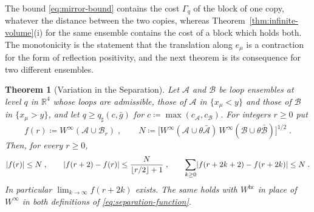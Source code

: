 \documentclass[11pt]{preprint}
\DeclarePairedDelimiter{\abs}{\lvert}{\rvert}
\numberwithin{equation}{section}
\newtheorem{theorem}{Theorem}[section]
\theoremstyle{definition}
\theoremstyle{remark}
\theoremstyle{plain}
\begin{document}
The bound \eqref{eq:mirror-bound} contains the cost $\Gamma_q$ of the block of one copy, whatever the distance between the two copies, whereas Theorem~\ref{thm:infinite-volume}(i) for the same ensemble contains the cost of a block which holds both. The monotonicity is the statement that the translation along $e_\mu$ is a contraction for the form of reflection positivity, and the next theorem is its consequence for two different ensembles.

\begin{theorem}[Variation in the Separation]\label{thm:separation}
Let $\mathcal A$ and $\mathcal B$ be loop ensembles at level $q$ in $\mathbb R^4$ whose loops are admissible, those of $\mathcal A$ in $\{ x_\mu < y \}$ and those of $\mathcal B$ in $\{ x_\mu > y \}$, and let $q \geq q_\sharp(c, \bar g)$ for $c \coloneqq \max(c_{\mathcal A}, c_{\mathcal B})$. For integers $r \geq 0$ put
\begin{equation}\label{eq:separation-function}
    f(r) \coloneqq W^\infty(\mathcal A \cup \mathcal B_r)\;,
    \qquad
    N \coloneqq \bigl[W^\infty(\mathcal A \cup \theta\bar{\mathcal A})\,W^\infty(\mathcal B \cup \theta\bar{\mathcal B})\bigr]^{1/2}\;.
\end{equation}
Then, for every $r \geq 0$,
\begin{equation}\label{eq:separation-bounds}
    \abs{f(r)} \leq N\;,
    \qquad
    \abs{f(r + 2) - f(r)} \leq \frac{N}{\lfloor r/2\rfloor + 1}\;,
    \qquad
    \sum_{k \geq 0}\abs{f(r + 2k + 2) - f(r + 2k)} \leq N\;.
\end{equation}
In particular $\lim_{k \to \infty}f(r + 2k)$ exists. The same holds with $W^{\mathrm{hc}}$ in place of $W^\infty$ in both definitions of \eqref{eq:separation-function}.
\end{theorem}
\end{document}
